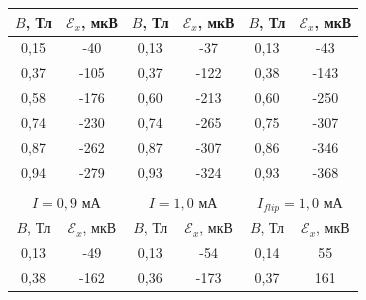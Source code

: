 \documentclass[a4paper, 12pt]{article}
\begin{document}
\begin{table}[H]
\begin{tabular}{cccccc}
        \multicolumn{1}{|c|}{$B$, Тл} & \multicolumn{1}{c|}{$\mathcal{E}_x$, мкВ} & \multicolumn{1}{c|}{$B$, Тл} & \multicolumn{1}{c|}{$\mathcal{E}_x$, мкВ} & \multicolumn{1}{c|}{$B$, Тл} & \multicolumn{1}{c|}{$\mathcal{E}_x$, мкВ} \\ \hline
        \multicolumn{1}{|c|}{0,15} & \multicolumn{1}{c|}{-40} & \multicolumn{1}{c|}{0,13} & \multicolumn{1}{c|}{-37} & \multicolumn{1}{c|}{0,13} & \multicolumn{1}{c|}{-43} \\ \hline
        \multicolumn{1}{|c|}{0,37} & \multicolumn{1}{c|}{-105} & \multicolumn{1}{c|}{0,37} & \multicolumn{1}{c|}{-122} & \multicolumn{1}{c|}{0,38} & \multicolumn{1}{c|}{-143} \\ \hline
        \multicolumn{1}{|c|}{0,58} & \multicolumn{1}{c|}{-176} & \multicolumn{1}{c|}{0,60} & \multicolumn{1}{c|}{-213} & \multicolumn{1}{c|}{0,60} & \multicolumn{1}{c|}{-250} \\ \hline
        \multicolumn{1}{|c|}{0,74} & \multicolumn{1}{c|}{-230} & \multicolumn{1}{c|}{0,74} & \multicolumn{1}{c|}{-265} & \multicolumn{1}{c|}{0,75} & \multicolumn{1}{c|}{-307} \\ \hline
        \multicolumn{1}{|c|}{0,87} & \multicolumn{1}{c|}{-262} & \multicolumn{1}{c|}{0,87} & \multicolumn{1}{c|}{-307} & \multicolumn{1}{c|}{0,86} & \multicolumn{1}{c|}{-346} \\ \hline
        \multicolumn{1}{|c|}{0,94} & \multicolumn{1}{c|}{-279} & \multicolumn{1}{c|}{0,93} & \multicolumn{1}{c|}{-324} & \multicolumn{1}{c|}{0,93} & \multicolumn{1}{c|}{-368} \\ \hline
        \multicolumn{1}{l}{} & \multicolumn{1}{l}{} & \multicolumn{1}{l}{} & \multicolumn{1}{l}{} & \multicolumn{1}{l}{} & \multicolumn{1}{l}{} \\ \hline
        \multicolumn{2}{|c|}{$I = 0,9$ мА} & \multicolumn{2}{c|}{$I = 1,0$ мА} & \multicolumn{2}{c|}{$I_{flip} = 1,0$ мА} \\ \hline
        \multicolumn{1}{|c|}{$B$, Тл} & \multicolumn{1}{c|}{$\mathcal{E}_x$, мкВ} & \multicolumn{1}{c|}{$B$, Тл} & \multicolumn{1}{c|}{$\mathcal{E}_x$, мкВ} & \multicolumn{1}{c|}{$B$, Тл} & \multicolumn{1}{c|}{$\mathcal{E}_x$, мкВ} \\ \hline
        \multicolumn{1}{|c|}{0,13} & \multicolumn{1}{c|}{-49} & \multicolumn{1}{c|}{0,13} & \multicolumn{1}{c|}{-54} & \multicolumn{1}{c|}{0,14} & \multicolumn{1}{c|}{55} \\ \hline
        \multicolumn{1}{|c|}{0,38} & \multicolumn{1}{c|}{-162} & \multicolumn{1}{c|}{0,36} & \multicolumn{1}{c|}{-173} & \multicolumn{1}{c|}{0,37} & \multicolumn{1}{c|}{161} \\ \hline

\end{tabular}
\end{table}
\end{document}
